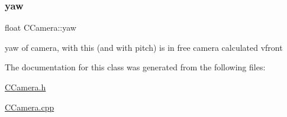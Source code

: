 \mbox{\label{class_c_camera_a0a0488eeda9bcd1e4f9eff6d2029554a}} 
\subsubsection{\texorpdfstring{yaw}{yaw}}
{\footnotesize\ttfamily float C\+Camera\+::yaw}



yaw of camera, with this (and with pitch) is in free camera calculated vfront 



The documentation for this class was generated from the following files\+:\begin{DoxyCompactItemize}
\item 
\mbox{\hyperlink{_c_camera_8h}{C\+Camera.\+h}}\item 
\mbox{\hyperlink{_c_camera_8cpp}{C\+Camera.\+cpp}}\end{DoxyCompactItemize}
